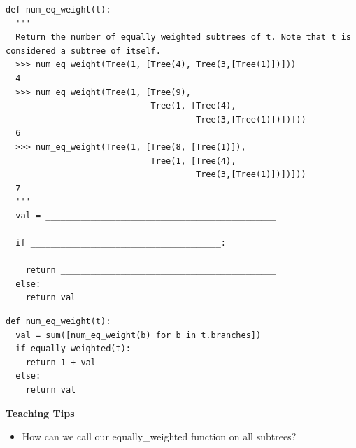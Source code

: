 \begin{parts}
\begin{lstlisting}
def num_eq_weight(t):
  '''
  Return the number of equally weighted subtrees of t. Note that t is considered a subtree of itself.
  >>> num_eq_weight(Tree(1, [Tree(4), Tree(3,[Tree(1)])]))
  4
  >>> num_eq_weight(Tree(1, [Tree(9), 
                             Tree(1, [Tree(4), 
                                      Tree(3,[Tree(1)])])]))
  6
  >>> num_eq_weight(Tree(1, [Tree(8, [Tree(1)]), 
                             Tree(1, [Tree(4), 
                                      Tree(3,[Tree(1)])])]))
  7
  '''
  val = ______________________________________________

  if ______________________________________:

    return ___________________________________________
  else:
    return val
\end{lstlisting}

\begin{solution}
\begin{lstlisting}
def num_eq_weight(t):
  val = sum([num_eq_weight(b) for b in t.branches])
  if equally_weighted(t):
    return 1 + val
  else:
    return val
\end{lstlisting}
\end{solution}
\begin{guide}
\textbf{Teaching Tips}
  \begin{itemize}
    \item How can we call our equally\_weighted function on all subtrees?
  \end{itemize}
\end{guide}
\end{parts}